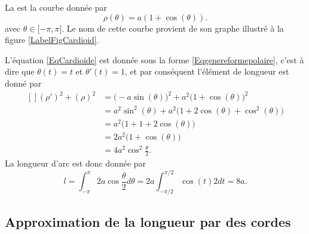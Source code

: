 \begin{example}
    La  est la courbe donnée par
    \begin{equation}        \label{EqCardioide}
        \rho(\theta)=a(1+\cos(\theta)).
    \end{equation}
    avec $\theta\in\mathopen[ -\pi , \pi \mathclose]$. Le nom de cette courbe provient de son graphe illustré à la figure \ref{LabelFigCardioid}.
    \newcommand{\CaptionFigCardioid}{Une cardioïde, $\rho=1+\cos(\theta)$.}
    

    L'équation \eqref{EqCardioide} est donnée sous la forme \eqref{Eqgenereformepolaire}, c'est à dire que $\theta(t)=t$ et $\theta'(t)=1$, et par conséquent l'élément de longueur est donné par
    \begin{equation}
        \begin{aligned}[]
            (\rho')^2+(\rho)^2&=\big( -a\sin(\theta) \big)^2+a^2\big( 1+\cos(\theta) \big)^2\\
                    &=a^2\sin^2(\theta)+a^2\big( 1+2\cos(\theta)+\cos^2(\theta) \big)\\
                    &=a^2\big( 1+1+2\cos(\theta) \big)\\
                    &=2a^2\big( 1+\cos(\theta) \big)\\
                    &=4a^2\cos^2\frac{ \theta }{2}.
        \end{aligned}
    \end{equation}
    La longueur d'arc est donc donnée par
    \begin{equation}
        l=\int_{-\pi}^{\pi}2a\cos\frac{ \theta }{2}d\theta=2a\int_{-\pi/2}^{\pi/2}\cos(t)2dt=8a.
    \end{equation}
\end{example}

\subsection{Approximation de la longueur par des cordes}

